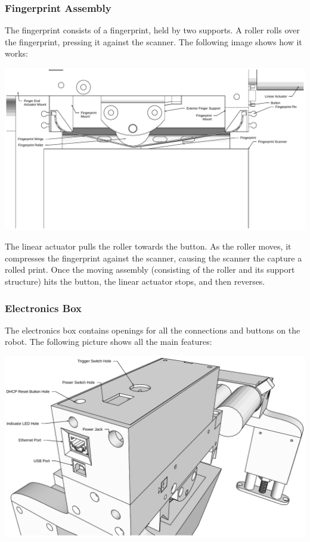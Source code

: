 \documentclass[letterpaper,10pt,english]{sphinxmanual}
\begin{document}
\subsubsection{Fingerprint Assembly}
\label{NARFSTR:fingerprint-assembly}
The fingerprint consists of a fingerprint, held by two supports. A roller rolls over the fingerprint, pressing it against the scanner. The following image shows how it works:

\includegraphics{FingerprintAssembly.pdf}

The linear actuator pulls the roller towards the button. As the roller moves, it compresses the fingerprint against the scanner, causing the scanner the capture a rolled print. Once the moving assembly (consisting of the roller and its support structure) hits the button, the linear actuator stops, and then reverses.


\subsubsection{Electronics Box}
\label{NARFSTR:electronics-box}
The electronics box contains openings for all the connections and buttons on the robot. The following picture shows all the main features:

\includegraphics{ElectronicsHousingFront.pdf}
\end{document}
